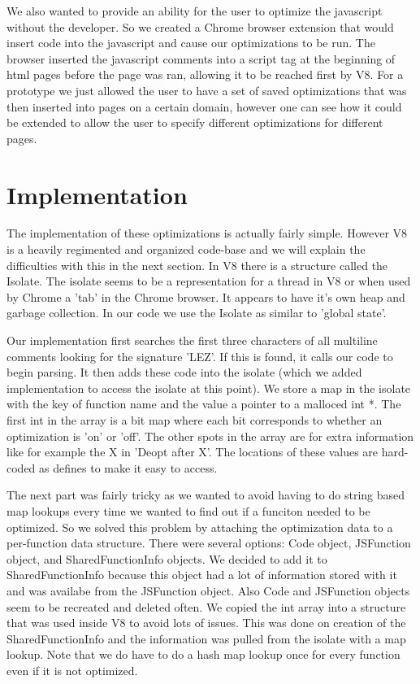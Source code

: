 \documentclass[twocolumn,showpacs,%
  nofootinbib,aps,superscriptaddress,%
  eqsecnum,prd,notitlepage,showkeys,10pt]{revtex4-1}
\begin{document}
We also wanted to provide an ability for the user to optimize the javascript without the developer. So we created a Chrome browser extension that would insert code into the javascript and cause our optimizations to be run. The browser inserted the javascript comments into a script tag at the beginning of html pages before the page was ran, allowing it to be reached first by V8. For a prototype we just allowed the user to have a set of saved optimizations that was then inserted into pages on a certain domain, however one can see how it could be extended to allow the user to specify different optimizations for different pages.

\section{Implementation}
The implementation of these optimizations is actually fairly simple. However V8 is a heavily regimented and organized code-base and we will explain the difficulties with this in the next section. In V8 there is a structure called the Isolate. The isolate seems to be a representation for a thread in V8 or when used by Chrome a 'tab' in the Chrome browser. It appears to have it's own heap and garbage collection. In our code we use the Isolate as similar to 'global state'.

Our implementation first searches the first three characters of all multiline comments looking for the signature 'LEZ'. If this is found, it calls our code to begin parsing. It then adds these code into the isolate (which we added implementation to access the isolate at this point). We store a map in the isolate with the key of function name and the value a pointer to a malloced int *. The first int in the array is a bit map where each bit corresponds to whether an optimization is 'on' or 'off'. The other spots in the array are for extra information like for example the X in 'Deopt after X'. The locations of these values are hard-coded as defines to make it easy to access.

The next part was fairly tricky as we wanted to avoid having to do string based map lookups every time we wanted to find out if a funciton needed to be optimized. So we solved this problem by attaching the optimization data to a per-function data structure. There were several options: Code object, JSFunction object, and SharedFunctionInfo objects. We decided to add it to SharedFunctionInfo because this object had a lot of information stored with it and was availabe from the JSFunction object. Also Code and JSFunction objects seem to be recreated and deleted often. We copied the int array into a structure that was used inside V8 to avoid lots of issues. This was done on creation of the SharedFunctionInfo and the information was pulled from the isolate with a map lookup. Note that we do have to do a hash map lookup once for every function even if it is not optimized.
\end{document}
